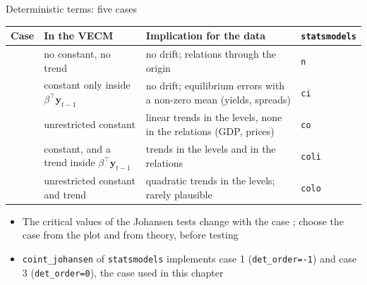 \begin{frame}{Deterministic terms: five cases}
\itemsize{\small}
\begin{center}
\scriptsize
\begin{tabular}{>{\raggedright\arraybackslash}p{0.6cm}>{\raggedright\arraybackslash}p{4.6cm}>{\raggedright\arraybackslash}p{4.4cm}>{\raggedright\arraybackslash}p{2.6cm}}
\toprule
\textbf{Case} & \textbf{In the VECM} & \textbf{Implication for the data} & \texttt{statsmodels} \\
\midrule
1 & no constant, no trend & no drift; relations through the origin & \texttt{n} \\
2 & constant only inside $\beta^\top\mathbf y_{t-1}$ & no drift; equilibrium errors with a non-zero mean (yields, spreads) & \texttt{ci} \\
3 & unrestricted constant & linear trends in the levels, none in the relations (GDP, prices) & \texttt{co} \\
4 & constant, and a trend inside $\beta^\top\mathbf y_{t-1}$ & trends in the levels and in the relations & \texttt{coli} \\
5 & unrestricted constant and trend & quadratic trends in the levels; rarely plausible & \texttt{colo} \\
\bottomrule
\end{tabular}
\end{center}
\begin{itemize}
    \item The critical values of the Johansen tests change with the case ; choose the case from the plot and from theory, before testing
    \item \texttt{coint\_johansen} of \texttt{statsmodels} implements case 1 (\texttt{det\_order=-1}) and case 3 (\texttt{det\_order=0}), the case used in this chapter
\end{itemize}
\end{frame}


